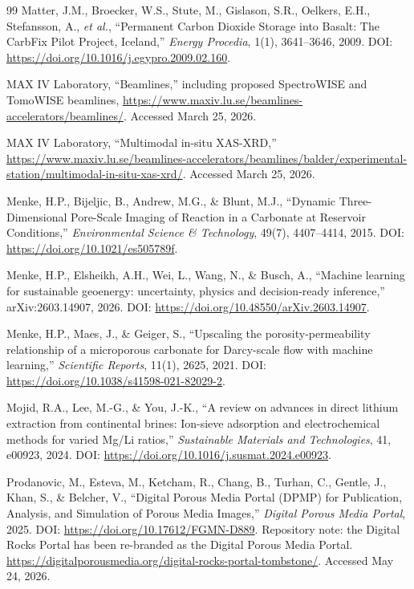 \documentclass[12pt,a4paper]{article}
\begin{document}
\begin{thebibliography}{99}
Matter, J.M., Broecker, W.S., Stute, M., Gislason, S.R., Oelkers, E.H., Stefansson, A., \textit{et al.}, ``Permanent Carbon Dioxide Storage into Basalt: The CarbFix Pilot Project, Iceland,'' \textit{Energy Procedia}, 1(1), 3641--3646, 2009. DOI: \url{https://doi.org/10.1016/j.egypro.2009.02.160}.

MAX IV Laboratory, ``Beamlines,'' including proposed SpectroWISE and TomoWISE beamlines, \url{https://www.maxiv.lu.se/beamlines-accelerators/beamlines/}. Accessed March 25, 2026.

MAX IV Laboratory, ``Multimodal in-situ XAS-XRD,'' \url{https://www.maxiv.lu.se/beamlines-accelerators/beamlines/balder/experimental-station/multimodal-in-situ-xas-xrd/}. Accessed March 25, 2026.

Menke, H.P., Bijeljic, B., Andrew, M.G., \& Blunt, M.J., ``Dynamic Three-Dimensional Pore-Scale Imaging of Reaction in a Carbonate at Reservoir Conditions,'' \textit{Environmental Science \& Technology}, 49(7), 4407--4414, 2015. DOI: \url{https://doi.org/10.1021/es505789f}.

Menke, H.P., Elsheikh, A.H., Wei, L., Wang, N., \& Busch, A., ``Machine learning for sustainable geoenergy: uncertainty, physics and decision-ready inference,'' arXiv:2603.14907, 2026. DOI: \url{https://doi.org/10.48550/arXiv.2603.14907}.

Menke, H.P., Maes, J., \& Geiger, S., ``Upscaling the porosity-permeability relationship of a microporous carbonate for Darcy-scale flow with machine learning,'' \textit{Scientific Reports}, 11(1), 2625, 2021. DOI: \url{https://doi.org/10.1038/s41598-021-82029-2}.

Mojid, R.A., Lee, M.-G., \& You, J.-K., ``A review on advances in direct lithium extraction from continental brines: Ion-sieve adsorption and electrochemical methods for varied Mg/Li ratios,'' \textit{Sustainable Materials and Technologies}, 41, e00923, 2024. DOI: \url{https://doi.org/10.1016/j.susmat.2024.e00923}.

Prodanovic, M., Esteva, M., Ketcham, R., Chang, B., Turhan, C., Gentle, J., Khan, S., \& Belcher, V., ``Digital Porous Media Portal (DPMP) for Publication, Analysis, and Simulation of Porous Media Images,'' \textit{Digital Porous Media Portal}, 2025. DOI: \url{https://doi.org/10.17612/FGMN-D889}. Repository note: the Digital Rocks Portal has been re-branded as the Digital Porous Media Portal. \url{https://digitalporousmedia.org/digital-rocks-portal-tombstone/}. Accessed May 24, 2026.


\end{thebibliography}
\end{document}

